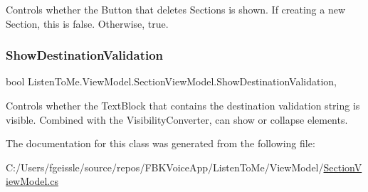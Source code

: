 Controls whether the Button that deletes Sections is shown. If creating a new Section, this is false. Otherwise, true. 

\mbox{\label{class_listen_to_me_1_1_view_model_1_1_section_view_model_a82a97f1530d04dd2f88d29b886cc6593}} 
\subsubsection{\texorpdfstring{Show\+Destination\+Validation}{ShowDestinationValidation}}
{\footnotesize\ttfamily bool Listen\+To\+Me.\+View\+Model.\+Section\+View\+Model.\+Show\+Destination\+Validation\hspace{0.3cm}{\ttfamily [get]}, {}}



Controls whether the Text\+Block that contains the destination validation string is visible. Combined with the Visibility\+Converter, can show or collapse elements. 



The documentation for this class was generated from the following file\+:\begin{DoxyCompactItemize}
\item 
C\+:/\+Users/fgeissle/source/repos/\+F\+B\+K\+Voice\+App/\+Listen\+To\+Me/\+View\+Model/\mbox{\hyperlink{_section_view_model_8cs}{Section\+View\+Model.\+cs}}\end{DoxyCompactItemize}
